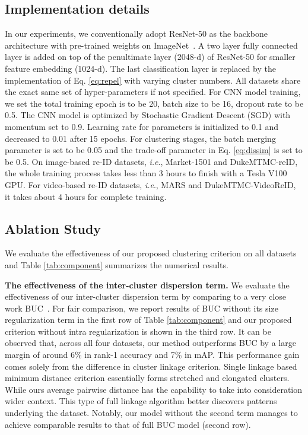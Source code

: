 \documentclass[journal]{IEEEtran}
\newcommand{\ie}{\textit{i.e}.}
\begin{document}
\subsection{Implementation details}
In our experiments, we conventionally adopt ResNet-50 \cite{he2016deep} as the backbone architecture with pre-trained weights on ImageNet~\cite{deng2009imagenet}. A two layer fully connected layer is added on top of the penultimate layer (2048-d) of ResNet-50 for smaller feature embedding (1024-d). The last classification layer is replaced by the implementation of Eq. \eqref{eq:repel} with varying cluster numbers. All datasets share the exact same set of hyper-parameters if not specified. For CNN model training, we set the total training epoch is to be 20, batch size to be 16, dropout rate to be 0.5. The CNN model is optimized by Stochastic Gradient Descent (SGD) with momentum set to 0.9. Learning rate for parameters is initialized to 0.1 and decreased to 0.01 after 15 epochs. For clustering stages, the batch merging parameter  is set to be 0.05 and the trade-off parameter  in Eq. \eqref{eq:dissim} is set to be 0.5. On image-based re-ID datasets, \ie, Market-1501 and DukeMTMC-reID, the whole training process takes less than 3 hours to finish with a Tesla V100 GPU. For video-based re-ID datasets, \ie, MARS and DukeMTMC-VideoReID, it takes about 4 hours for complete training.




\subsection{Ablation Study}
\label{subsec:ablation}
We evaluate the effectiveness of our proposed clustering criterion on all datasets and Table \ref{tab:component} summarizes the numerical results.



\textbf{The effectiveness of the inter-cluster dispersion term.} We evaluate the effectiveness of our inter-cluster dispersion term by comparing to a very close work BUC~\cite{lin2019bottom}. For fair comparison, we report results of BUC without its size regularization term in the first row of Table \ref{tab:component} and our proposed criterion without intra regularization is shown in the third row. It can be observed that, across all four datasets, our method outperforms BUC by a large margin of around 6\% in rank-1 accuracy and 7\% in mAP. This performance gain comes solely from the difference in cluster linkage criterion. Single linkage based minimum distance criterion essentially forms stretched and elongated clusters. While ours average pairwise distance has the capability to take into consideration wider context. This type of full linkage algorithm better discovers patterns underlying the dataset. Notably, our model without the second term manages to achieve comparable results to that of full BUC model (second row). 
\end{document}
